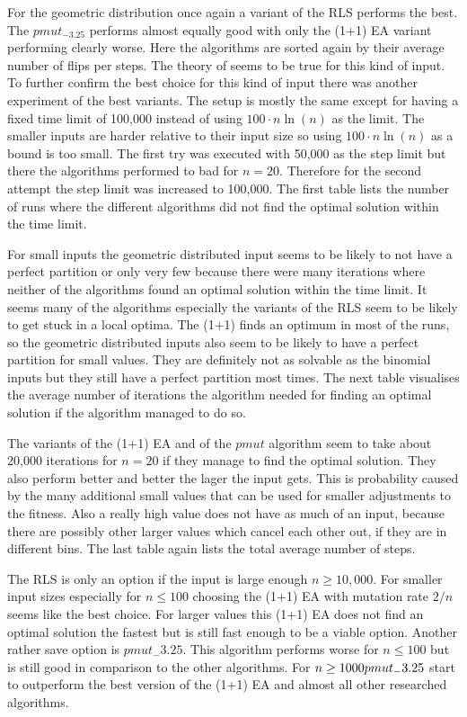 For the geometric distribution once again a variant of the RLS performs the best.
The $pmut_{-3.25}$ performs almost equally good with only the (1+1) EA variant performing clearly worse.
Here the algorithms are sorted again by their average number of flips per steps. The theory of seems to be true for this kind of input.\newline
To further confirm the best choice for this kind of input there was another experiment of the best variants.
The setup is mostly the same except for having a fixed time limit of 100,000 instead of using $100 \cdot n\ln(n)$ as the limit.
The smaller inputs are harder relative to their input size so using $100 \cdot n\ln(n)$ as a bound is too small.
The first try was executed with 50,000 as the step limit but there the algorithms performed to bad for $n=20$.
Therefore for the second attempt the step limit was increased to 100,000.
The first table lists the number of runs where the different algorithms did not find the optimal solution within the time limit.



For small inputs the geometric distributed input seems to be likely to not have a perfect partition or only very few because there were many iterations where neither of the algorithms found an optimal solution within the time limit.
It seems many of the algorithms especially the variants of the RLS seem to be likely to get stuck in a local optima.
The (1+1) finds an optimum in most of the runs, so the geometric distributed inputs also seem to be likely to have a perfect partition for small values.
They are definitely not as solvable as the binomial inputs but they still have a perfect partition most times.
The next table visualises the average number of iterations the algorithm needed for finding an optimal solution if the algorithm managed to do so.



The variants of the (1+1) EA and of the $pmut$ algorithm seem to take about 20,000 iterations for $n=20$ if they manage to find the optimal solution.
They also perform better and better the lager the input gets.
This is probability caused by the many additional small values that can be used for smaller adjustments to the fitness.
Also a really high value does not have as much of an input, because there are possibly other larger values which cancel each other out, if they are in different bins.
The last table again lists the total average number of steps.



The RLS is only an option if the input is large enough $n \ge 10,000$. For smaller input sizes especially for $n \le 100$ choosing the (1+1) EA with mutation rate $2/n$ seems like the best choice. For larger values this (1+1) EA does not find an optimal solution the fastest but is still fast enough to be a viable option. Another rather save option is $pmut_-3.25$. This algorithm performs worse for $n \le 100$ but is still good in comparison to the other algorithms. For $n \ge 1000 \space pmut_-3.25$ start to outperform the best version of the (1+1) EA and almost all other researched algorithms.